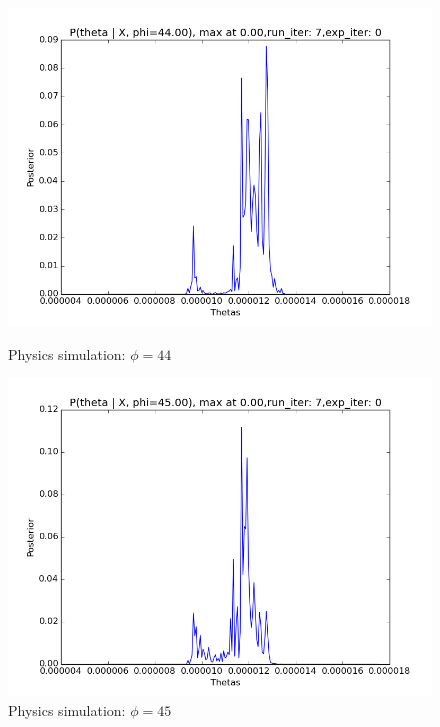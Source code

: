 \documentclass[10pt,journal,compsoc]{IEEEtran}
\begin{document}
\begin{figure}
\begin{minipage}[b]{0.5\linewidth}
\centering
\includegraphics[width=1\linewidth]{PhysicsPlots/LP4.png} 
\caption{\label{fig:LP4}Physics simulation: $\phi=44$}
\end{minipage} 		
\begin{minipage}[b]{0.5\linewidth}
\centering
\includegraphics[width=1\linewidth]{PhysicsPlots/LP5.png} 
\caption{\label{fig:LP5}Physics simulation: $\phi=45$}
\end{minipage} 
\begin{minipage}[b]{0.5\linewidth}
\centering

\end{minipage}
\end{figure}
\end{document}
